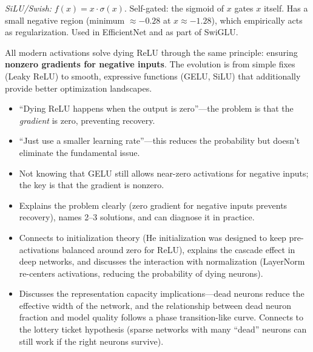 \begin{interviewq}
\textit{SiLU/Swish:} $f(x) = x \cdot \sigma(x)$. Self-gated: the sigmoid of $x$ gates $x$ itself. Has a small negative region (minimum $\approx -0.28$ at $x \approx -1.28$), which empirically acts as regularization. Used in EfficientNet and as part of SwiGLU.

All modern activations solve dying ReLU through the same principle: ensuring \textbf{nonzero gradients for negative inputs}. The evolution is from simple fixes (Leaky ReLU) to smooth, expressive functions (GELU, SiLU) that additionally provide better optimization landscapes.

\redflags
\begin{itemize}
    \item ``Dying ReLU happens when the output is zero''---the problem is that the \textit{gradient} is zero, preventing recovery.
    \item ``Just use a smaller learning rate''---this reduces the probability but doesn't eliminate the fundamental issue.
    \item Not knowing that GELU still allows near-zero activations for negative inputs; the key is that the gradient is nonzero.
\end{itemize}


\goodgreat
\begin{itemize}
    \item {} Explains the problem clearly (zero gradient for negative inputs prevents recovery), names 2--3 solutions, and can diagnose it in practice.
    \item {} Connects to initialization theory (He initialization was designed to keep pre-activations balanced around zero for ReLU), explains the cascade effect in deep networks, and discusses the interaction with normalization (LayerNorm re-centers activations, reducing the probability of dying neurons).
    \item {} Discusses the representation capacity implications---dead neurons reduce the effective width of the network, and the relationship between dead neuron fraction and model quality follows a phase transition-like curve. Connects to the lottery ticket hypothesis (sparse networks with many ``dead'' neurons can still work if the right neurons survive).
\end{itemize}

\end{interviewq}

